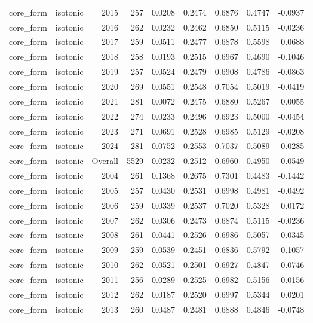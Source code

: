 \begin{table}[t]
\begin{tabular}{@{} l l r r r r r r r @{} }
      core\_form & isotonic & 2015 & 257 & 0.0208 & 0.2474 & 0.6876 & 0.4747 & -0.0937 \\
      core\_form & isotonic & 2016 & 262 & 0.0232 & 0.2462 & 0.6850 & 0.5115 & -0.0236 \\
      core\_form & isotonic & 2017 & 259 & 0.0511 & 0.2477 & 0.6878 & 0.5598 & 0.0688 \\
      core\_form & isotonic & 2018 & 258 & 0.0193 & 0.2515 & 0.6967 & 0.4690 & -0.1046 \\
      core\_form & isotonic & 2019 & 257 & 0.0524 & 0.2479 & 0.6908 & 0.4786 & -0.0863 \\
      core\_form & isotonic & 2020 & 269 & 0.0551 & 0.2548 & 0.7054 & 0.5019 & -0.0419 \\
      core\_form & isotonic & 2021 & 281 & 0.0072 & 0.2475 & 0.6880 & 0.5267 & 0.0055 \\
      core\_form & isotonic & 2022 & 274 & 0.0233 & 0.2496 & 0.6923 & 0.5000 & -0.0454 \\
      core\_form & isotonic & 2023 & 271 & 0.0691 & 0.2528 & 0.6985 & 0.5129 & -0.0208 \\
      core\_form & isotonic & 2024 & 281 & 0.0752 & 0.2553 & 0.7037 & 0.5089 & -0.0285 \\
      core\_form & isotonic & Overall & 5529 & 0.0232 & 0.2512 & 0.6960 & 0.4950 & -0.0549 \\
      core\_form & isotonic & 2004 & 261 & 0.1368 & 0.2675 & 0.7301 & 0.4483 & -0.1442 \\
      core\_form & isotonic & 2005 & 257 & 0.0430 & 0.2531 & 0.6998 & 0.4981 & -0.0492 \\
      core\_form & isotonic & 2006 & 259 & 0.0339 & 0.2537 & 0.7020 & 0.5328 & 0.0172 \\
      core\_form & isotonic & 2007 & 262 & 0.0306 & 0.2473 & 0.6874 & 0.5115 & -0.0236 \\
      core\_form & isotonic & 2008 & 261 & 0.0441 & 0.2526 & 0.6986 & 0.5057 & -0.0345 \\
      core\_form & isotonic & 2009 & 259 & 0.0539 & 0.2451 & 0.6836 & 0.5792 & 0.1057 \\
      core\_form & isotonic & 2010 & 262 & 0.0521 & 0.2501 & 0.6927 & 0.4847 & -0.0746 \\
      core\_form & isotonic & 2011 & 256 & 0.0289 & 0.2525 & 0.6982 & 0.5156 & -0.0156 \\
      core\_form & isotonic & 2012 & 262 & 0.0187 & 0.2520 & 0.6997 & 0.5344 & 0.0201 \\
      core\_form & isotonic & 2013 & 260 & 0.0487 & 0.2481 & 0.6888 & 0.4846 & -0.0748 \\

\end{tabular}
\end{table}
